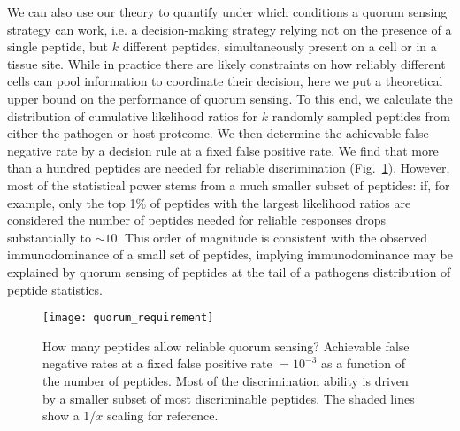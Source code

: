 \documentclass[superscriptaddress,twocolumn,pre]{revtex4}
\newcommand{\<}{\langle}
\renewcommand{\>}{\rangle}
\begin{document}
We can also use our theory to quantify under which conditions a quorum sensing strategy can work, i.e. a decision-making strategy relying not on the presence of a single peptide, but $k$ different peptides, simultaneously present on a cell or in a tissue site. While in practice there are likely constraints on how reliably different cells can pool information to coordinate their decision, here we put a theoretical upper bound on the performance of quorum sensing. To this end, we calculate the distribution of cumulative likelihood ratios for $k$ randomly sampled peptides from either the pathogen or host proteome. We then determine the achievable false negative rate by a decision rule at a fixed false positive rate. We find that more than a hundred peptides are needed for reliable discrimination (Fig.~\ref{figquorum}). However, most of the statistical power stems from a much smaller subset of peptides: if, for example, only the top 1\% of peptides with the largest likelihood ratios are considered the number of peptides needed for reliable responses drops substantially to $\sim 10$. This order of magnitude is consistent with the observed immunodominance of a small set of peptides, implying immunodominance may be explained by quorum sensing of peptides at the tail of a pathogens distribution of peptide statistics.

\begin{figure}
    \begin{center}
    \texttt{[image: quorum\_requirement]}
    \end{center}
    \caption{How many peptides allow reliable quorum sensing? Achievable false negative rates at a fixed false positive rate $=10^{-3}$ as a function of the number of peptides. Most of the discrimination ability is driven by a smaller subset of most discriminable peptides. The shaded lines show a 1/$x$ scaling for reference. 
    \label{figquorum}
    }
\end{figure}


\end{document}
